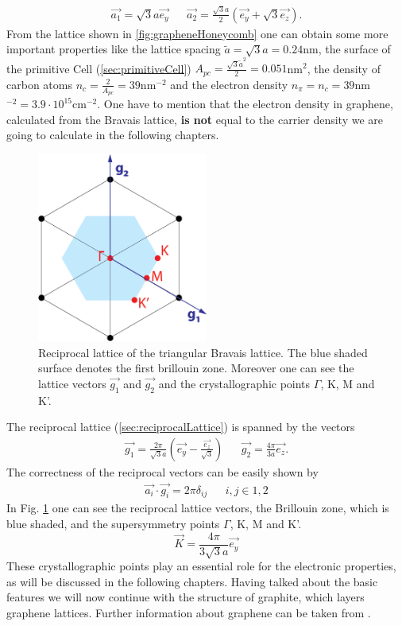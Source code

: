 			\begin{align}
				\vec{a_1} = \sqrt{3} a \vec{e_y} && \vec{a_2} =  \frac{\sqrt{3}a}{2} (\vec{e_y} + \sqrt{3} \vec{e_z}).
			\end{align}
			From the lattice shown in \ref{fig:grapheneHoneycomb} one can obtain some more important properties like the lattice spacing $\tilde{a} = \sqrt{3}a = 0.24$nm, the surface of the primitive Cell (\ref{sec:primitiveCell}) $A_{pc} = \frac{\sqrt{3}\tilde{a}^2}{2} = 0.051$nm$^2$, the density of carbon atoms $n_c = \frac{2}{A_{pc}} = 39$nm$^{-2}$ and the electron density $n_\pi = n_c = 39$nm$^{-2} = 3.9\cdot 10^{15}$cm$^{-2}$. One have to mention that the electron density in graphene, calculated from the Bravais lattice, \textbf{is not} equal to the carrier density we are going to calculate in the following chapters. 
			\begin{figure}[ht]
				
				\centering
				\includegraphics[width=0.5\textwidth]{figures/Carbon/grapheneBrillouin.png}
				\caption{Reciprocal lattice of the triangular Bravais lattice. The blue shaded surface denotes the first brillouin zone. Moreover one can see the lattice vectors $\vec{g_1}$ and $\vec{g_2}$ and the crystallographic points $\Gamma$, K, M and K'.}
				\label{fig:grapheneBrillouin}
			\end{figure}
			The reciprocal lattice (\ref{sec:reciprocalLattice}) is spanned by the vectors 
			\begin{align}
				\vec{g_1} = \frac{2\pi}{\sqrt{3}a} (\vec{e_y} - \frac{\vec{e_z}}{\sqrt{3}}) && \vec{g_2} = \frac{4 \pi}{3a} \vec{e_z}.
			\end{align}
			The correctness of the reciprocal vectors can be easily shown by 
			\begin{align}
				\vec{a_i} \cdot \vec{g_i} = 2 \pi \delta_{ij} && i,j \in {1,2}
			\end{align}
			In Fig. \ref{fig:grapheneBrillouin} one can see the reciprocal lattice vectors, the Brillouin zone, which is blue shaded, and the supersymmetry points $\Gamma$, K, M and K'.
			\begin{equation}
				\vec{K} = \frac{4 \pi}{3 \sqrt{3}a}\vec{e_y}
			\end{equation}
			These crystallographic points play an essential role for the electronic properties, as will be discussed in the following chapters. Having talked about the basic features we will now continue with the structure of graphite, which layers graphene lattices. Further information about graphene can be taken from \cite{grapheneProperties}.
		
